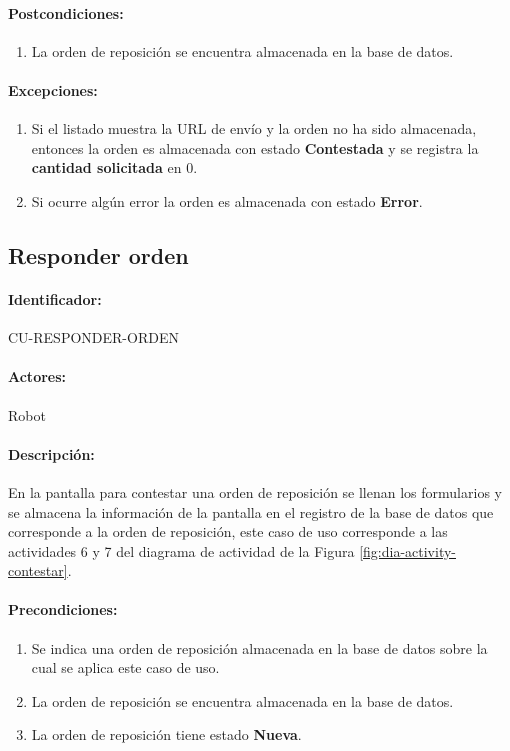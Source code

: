 \paragraph{Postcondiciones:}
\begin{enumerate}
  \item La orden de reposición se encuentra almacenada en la base de datos.
\end{enumerate}
\paragraph{Excepciones:}
\begin{enumerate}
  \item Si el listado muestra la URL de envío y la orden no ha sido almacenada, entonces la orden es almacenada con estado \textbf{Contestada} y se registra la \textbf{cantidad solicitada} en 0.
  \item Si ocurre algún error la orden es almacenada con estado \textbf{Error}.
\end{enumerate}


\subsection{Responder orden}\label{cu-responder-orden}
\paragraph{Identificador:}
CU-RESPONDER-ORDEN
\paragraph{Actores:}
Robot
\paragraph{Descripción:}
En la pantalla para contestar una orden de reposición se llenan los formularios y se almacena la información de la pantalla en el registro de la base de datos que corresponde a la orden de reposición, este caso de uso corresponde a las actividades 6 y 7 del diagrama de actividad de la Figura \ref{fig:dia-activity-contestar}.
\paragraph{Precondiciones:}
\begin{enumerate}
  \item Se indica una orden de reposición almacenada en la base de datos sobre la cual se aplica este caso de uso.
  \item La orden de reposición se encuentra almacenada en la base de datos.
  \item La orden de reposición tiene estado \textbf{Nueva}.
\end{enumerate}
